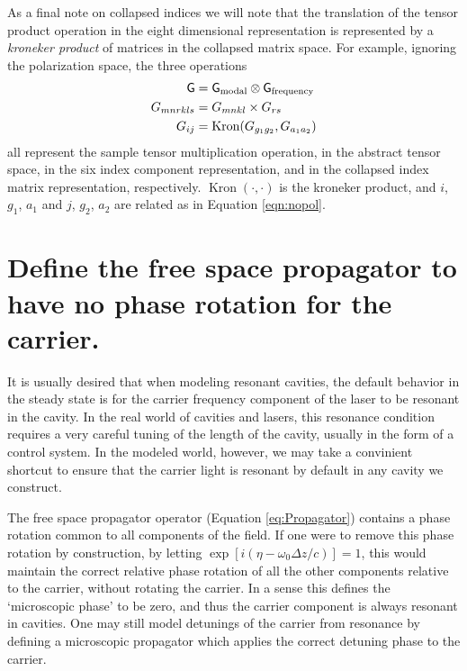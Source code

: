 As a final note on collapsed indices we will note that the translation of the tensor product operation in the eight dimensional representation is represented by a \emph{kroneker product} of matrices in the collapsed matrix space. %
For example, ignoring the polarization space, the three operations
\begin{align*}
\mathsf{G}&=\mathsf{G}_{\text{modal}}\otimes \mathsf{G}_{\text{frequency}}\\
G_{mnrkls}&=G_{mnkl}\times G_{rs}\\
G_{ij}&=\operatorname{Kron}(G_{g_1g_2},G_{a_1a_2})
\end{align*}
all represent the sample tensor multiplication operation, in the abstract tensor space, in the six index component representation, and in the collapsed index matrix representation, respectively. %
$\operatorname{Kron}(\cdot,\cdot)$ is the kroneker product, and $i$, $g_1$, $a_1$ and $j$, $g_2$, $a_2$ are related as in Equation \ref{eqn:nopol}.

\section{Define the free space propagator to have no phase rotation for the  carrier.}

It is usually desired that when modeling resonant cavities, the default behavior in the steady state is for the carrier frequency component of the laser to be resonant in the cavity. %
In the real world of cavities and lasers, this resonance condition requires a very careful tuning of the length of the cavity, usually in the form of a control system. %
In the modeled world, however, we may take a convinient shortcut to ensure that the carrier light is resonant by default in any cavity we construct.

The free space propagator operator (Equation \ref{eq:Propagator}) contains a phase rotation common to all components of the field. %
If one were to remove this phase rotation by construction, by letting $\exp[i(\eta - \omega_0 \Delta z/c)]=1$, this would maintain the correct relative phase rotation of all the other components relative to the carrier, without rotating the carrier. %
In a sense this defines the `microscopic phase' to be zero, and thus the  carrier component is always resonant in cavities. %
One may still model detunings of the carrier from resonance by defining a microscopic propagator which applies the correct detuning phase to the carrier.

